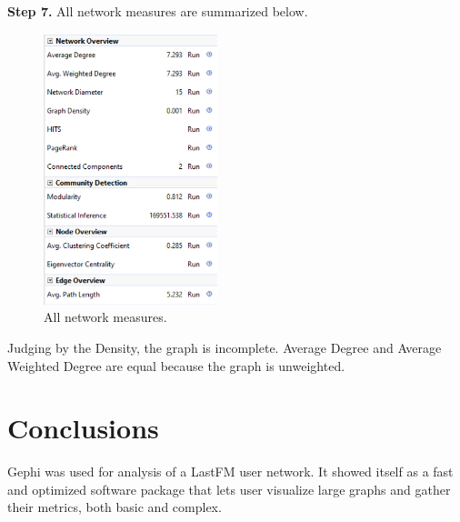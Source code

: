 \documentclass[12pt, a4paper]{article}
\begin{document}
\textbf{Step 7.} All network measures are summarized below.
\begin{figure}[!h]
\centering
\includegraphics[width=0.45\textwidth]{s7p1.png}
\caption{All network measures.}
\end{figure}

Judging by the Density, the graph is incomplete. Average Degree and Average Weighted Degree are equal because the graph is unweighted.

\section*{Conclusions}

Gephi was used for analysis of a LastFM user network. It showed itself as a fast and optimized software package that lets user visualize large graphs and gather their metrics, both basic and complex.
\end{document}
